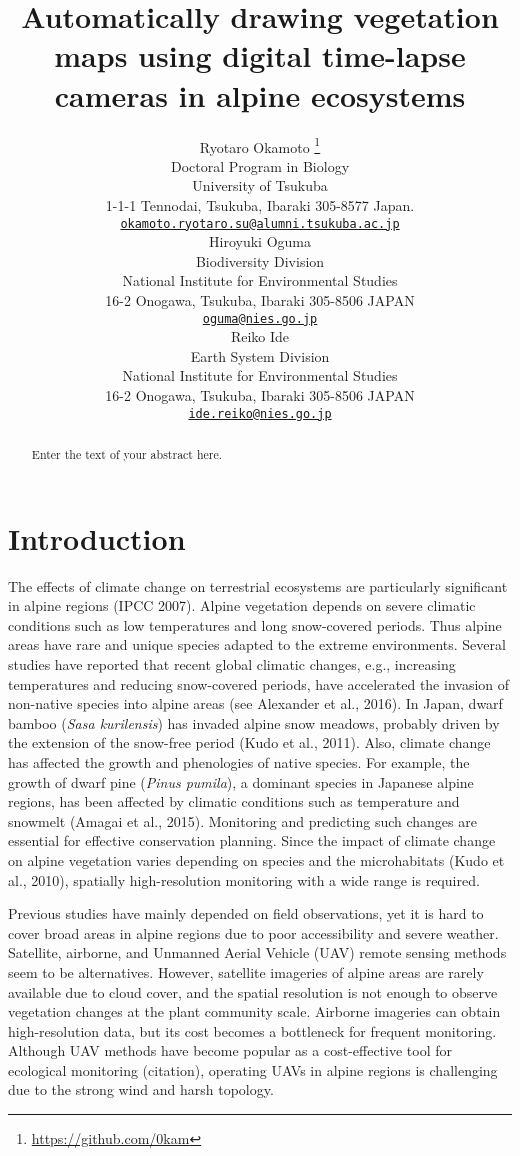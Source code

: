 \documentclass{article}
\title{Automatically drawing vegetation maps using digital time-lapse
cameras in alpine ecosystems}
\author{
    Ryotaro Okamoto
    \thanks{\url{https://github.com/0kam}}
   \\
    Doctoral Program in Biology \\
    University of Tsukuba \\
  1-1-1 Tennodai, Tsukuba, Ibaraki 305-8577 Japan. \\
  \texttt{\href{mailto:okamoto.ryotaro.su@alumni.tsukuba.ac.jp}{\nolinkurl{okamoto.ryotaro.su@alumni.tsukuba.ac.jp}}} \\
   \And
    Hiroyuki Oguma
   \\
    Biodiversity Division \\
    National Institute for Environmental Studies \\
  16-2 Onogawa, Tsukuba, Ibaraki 305-8506 JAPAN \\
  \texttt{\href{mailto:oguma@nies.go.jp}{\nolinkurl{oguma@nies.go.jp}}} \\
   \And
    Reiko Ide
   \\
    Earth System Division \\
    National Institute for Environmental Studies \\
  16-2 Onogawa, Tsukuba, Ibaraki 305-8506 JAPAN \\
  \texttt{\href{mailto:ide.reiko@nies.go.jp}{\nolinkurl{ide.reiko@nies.go.jp}}} \\
  }
\begin{document}
\maketitle


\begin{abstract}
Enter the text of your abstract here.
\end{abstract}


\hypertarget{introduction}{%
\section{Introduction}\label{introduction}}

The effects of climate change on terrestrial ecosystems are particularly
significant in alpine regions (IPCC 2007). Alpine vegetation depends on
severe climatic conditions such as low temperatures and long
snow-covered periods. Thus alpine areas have rare and unique species
adapted to the extreme environments. Several studies have reported that
recent global climatic changes, e.g., increasing temperatures and
reducing snow-covered periods, have accelerated the invasion of
non-native species into alpine areas (see Alexander et al., 2016). In
Japan, dwarf bamboo (\emph{Sasa kurilensis}) has invaded alpine snow
meadows, probably driven by the extension of the snow-free period (Kudo
et al., 2011). Also, climate change has affected the growth and
phenologies of native species. For example, the growth of dwarf pine
(\emph{Pinus pumila}), a dominant species in Japanese alpine regions,
has been affected by climatic conditions such as temperature and
snowmelt (Amagai et al., 2015). Monitoring and predicting such changes
are essential for effective conservation planning. Since the impact of
climate change on alpine vegetation varies depending on species and the
microhabitats (Kudo et al., 2010), spatially high-resolution monitoring
with a wide range is required.

Previous studies have mainly depended on field observations, yet it is
hard to cover broad areas in alpine regions due to poor accessibility
and severe weather. Satellite, airborne, and Unmanned Aerial Vehicle
(UAV) remote sensing methods seem to be alternatives. However, satellite
imageries of alpine areas are rarely available due to cloud cover, and
the spatial resolution is not enough to observe vegetation changes at
the plant community scale. Airborne imageries can obtain high-resolution
data, but its cost becomes a bottleneck for frequent monitoring.
Although UAV methods have become popular as a cost-effective tool for
ecological monitoring (citation), operating UAVs in alpine regions is
challenging due to the strong wind and harsh topology.
\end{document}
